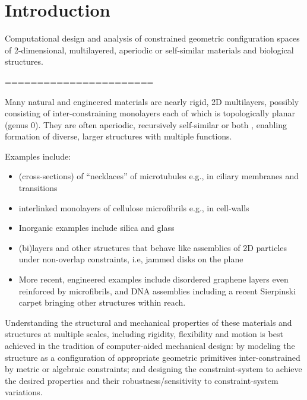 \section{Introduction}
Computational design and analysis of constrained geometric configuration spaces of 2-dimensional, multilayered, aperiodic or self-similar materials and biological structures.

=======================

Many natural and engineered materials are nearly rigid, 2D multilayers, possibly consisting of inter-constraining monolayers each of which is topologically planar (genus 0). They are often aperiodic, recursively self-similar or both \cite{Intro1}, enabling formation of diverse, larger structures with multiple functions.

Examples include:

\begin{itemize}
    \item (cross-sections) of ``necklaces'' of microtubules \cite{Necklace1} e.g., in ciliary membranes and transitions \cite{Necklace2}

    \item interlinked monolayers of cellulose microfibrils e.g., in cell-walls \cite{CellWalls1} \cite{CellWalls1}

    \item Inorganic examples include silica and glass \cite{SilicaGlass1} \cite{SilicaGlass2}

    \item (bi)layers and other structures that behave like assemblies of 2D particles under non-overlap constraints, i.e, jammed disks on the plane \cite{JammedDisk1}

    \item More recent, engineered examples include disordered graphene layers \cite{Graphene1} \cite{Graphene2}  even reinforced by  microfibrils, and DNA assemblies \cite{Microfibrils1} including a recent Sierpinski carpet bringing other structures \cite{Microfibrils2} within reach.
\end{itemize}

Understanding the structural and mechanical properties of these materials and structures at multiple scales, including rigidity, flexibility and motion is best achieved in the tradition of computer-aided mechanical design:  by modeling the structure as a configuration of appropriate geometric primitives inter-constrained by metric or algebraic constraints; and designing the constraint-system to achieve the desired properties and their robustness/sensitivity to constraint-system variations.

